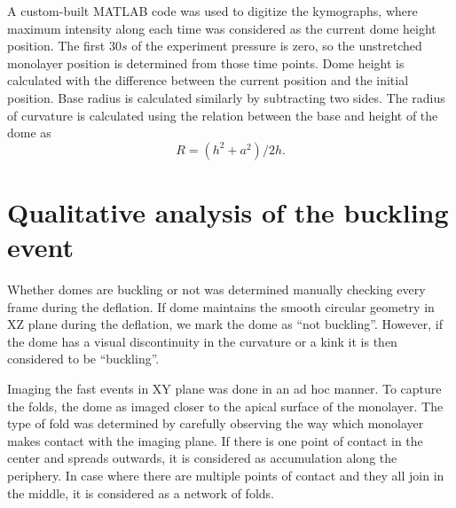 A custom-built MATLAB code was used to digitize the kymographs, where maximum intensity along each time was considered as the current dome height position. The first $30 s$ of the experiment pressure is zero, so the unstretched monolayer position is determined from those time points. Dome height is calculated with the difference between the current position and the initial position. Base radius is calculated similarly by subtracting two sides. The radius of curvature is calculated using the relation between the base and height of the dome as
$$R=(h^2+a^2)/2h.$$


\section{Qualitative analysis of the buckling event}

Whether domes are buckling or not was determined manually checking every frame during the deflation. If dome maintains the smooth circular geometry in XZ plane during the deflation, we mark the dome as “not buckling”. However, if the dome has a visual discontinuity in the curvature or a kink it is then considered to be “buckling”.

Imaging the fast events in XY plane was done in an ad hoc manner. To capture the folds, the dome as imaged closer to the apical surface of the monolayer. The type of fold was determined by carefully observing the way which monolayer makes contact with the imaging plane. If there is one point of contact in the center and spreads outwards, it is considered as accumulation along the periphery. In case where there are multiple points of contact and they all join in the middle, it is considered as a network of folds.